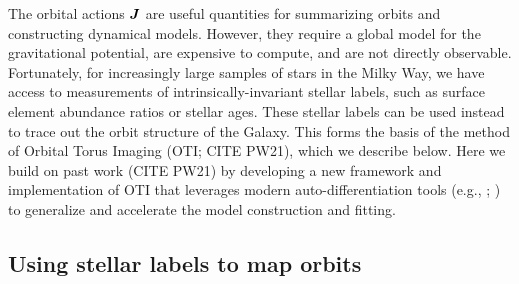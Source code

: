The orbital actions $\boldsymbol{J}$ are useful quantities for summarizing orbits and
constructing dynamical models.
However, they require a global model for the gravitational potential, are expensive to
compute, and are not directly observable.
Fortunately, for increasingly large samples of stars in the Milky Way, we have access to
measurements of intrinsically-invariant stellar labels, such as surface element
abundance ratios or stellar ages.
These stellar labels can be used instead to trace out the orbit structure of the Galaxy.
This forms the basis of the method of Orbital Torus Imaging (OTI; CITE PW21), which we
describe below.
Here we build on past work (CITE PW21) by developing a new framework and implementation
of OTI that leverages modern auto-differentiation tools (e.g., \jax; \citealt{jax:2018})
to generalize and accelerate the model construction and fitting.


\subsection{Using stellar labels to map orbits}
\label{sec:oti-stat}





